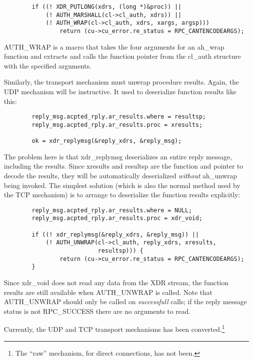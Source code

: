\begin{verbatim}
        if ((! XDR_PUTLONG(xdrs, (long *)&proc)) ||
            (! AUTH_MARSHALL(cl->cl_auth, xdrs)) ||
            (! AUTH_WRAP(cl->cl_auth, xdrs, xargs, argsp)))
                return (cu->cu_error.re_status = RPC_CANTENCODEARGS);
\end{verbatim}

AUTH_WRAP is a macro that takes the four arguments for an ah_wrap
function and extracts and calls the function pointer from the cl_auth
structure with the specified arguments.

Similarly, the transport mechanism must unwrap procedure results.
Again, the UDP mechanism will be instructive.  It used to deserialize
function results like this:

\begin{verbatim}
        reply_msg.acpted_rply.ar_results.where = resultsp;
        reply_msg.acpted_rply.ar_results.proc = xresults;

        ok = xdr_replymsg(&reply_xdrs, &reply_msg);
\end{verbatim}

The problem here is that xdr_replymsg deserializes an entire reply
message, including the results.  Since xresults and resultsp are the
function and pointer to decode the results, they will be automatically
deserialized {\it without} ah_unwrap being invoked.  The simplest
solution (which is also the normal method used by the TCP mechanism)
is to arrange to deserialize the function results explicitly:

\begin{verbatim}
        reply_msg.acpted_rply.ar_results.where = NULL;
        reply_msg.acpted_rply.ar_results.proc = xdr_void;

        if ((! xdr_replymsg(&reply_xdrs, &reply_msg)) ||
            (! AUTH_UNWRAP(cl->cl_auth, reply_xdrs, xresults,
                           resultsp))) {
                return (cu->cu_error.re_status = RPC_CANTENCODEARGS);
        }
\end{verbatim}

Since xdr_void does not read any data from the XDR stream, the
function results are still available when AUTH_UNWRAP is called.  Note
that AUTH_UNWRAP should only be called on {\it successfull} calls; if
the reply message status is not RPC_SUCCESS there are no arguments to
read.

Currently, the UDP and TCP transport mechanisms has been
converted.\footnote{The ``raw'' mechanism, for direct connections, has
not been.}

